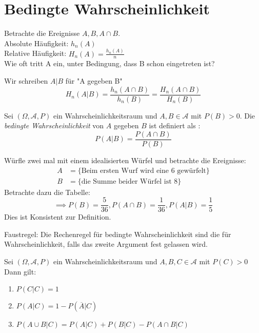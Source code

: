 \section{Bedingte Wahrscheinlichkeit}
Betrachte die Ereignisse $A,B, A \cap B$. \\
Absolute Häufigkeit: $h_n(A)$ \\
Relative Häufigkeit: $H_n(A)= \frac{h_n(A)}{n}$ \\
Wie oft tritt A ein, unter Bedingung, dass B schon eingetreten ist?
\begin{notation}
Wir schreiben $A|B$ für "A gegeben B"
\[
H_n(A|B) = \frac{h_n(A \cap B)}{h_n(B)} = \frac{H_n(A \cap B)}{H_n(B)}
\]
\end{notation}
\begin{definition}
	Sei $(\Omega, \mathcal{A}, P)$ ein Wahrscheinlichkeitsraum und $A,B \in \mathcal{A}$ mit $P(B)>0$. Die \emph{bedingte Wahrscheinlichkeit} von $A$ gegeben $B$ ist definiert als :
	\[
		P(A|B)= \frac{P(A \cap B)}{P(B)}
	\]
\end{definition}
\begin{example}
Würfle zwei mal mit einem idealisierten Würfel und betrachte die Ereignisse:
\begin{align*}
	A &= \{\text{Beim ersten Wurf wird eine 6 gewürfelt}\} \\
	B &= \{\text{die Summe beider Würfel ist 8}\} 
\end{align*}
Betrachte dazu die Tabelle:
\[
\implies P(B) = \frac{5}{36}, P(A \cap B)= \frac{1}{36}, P(A|B)= \frac{1}{5}
\]
Dies ist Konsistent zur Definition. 
\end{example}
Faustregel: Die Rechenregel für bedingte Wahrscheinlichkeit sind die für Wahrscheinlichkeit, falls das zweite Argument fest gelassen wird.
\begin{theorem}
	Sei $( \Omega, \mathcal{A}, P)$ ein Wahrscheinlichkeitsraum und $A,B,C \in \mathcal{A}$ mit $P(C) > 0$ Dann gilt:
	\begin{enumerate}
		\item $P(C|C)=1$
		\item $P(A|C)=1-P(\overline{A}|C)$
		\item $P(A \cup B |C)= P(A|C) + P(B|C) -P(A \cap B| C)$ 
	\end{enumerate}
\end{theorem}
